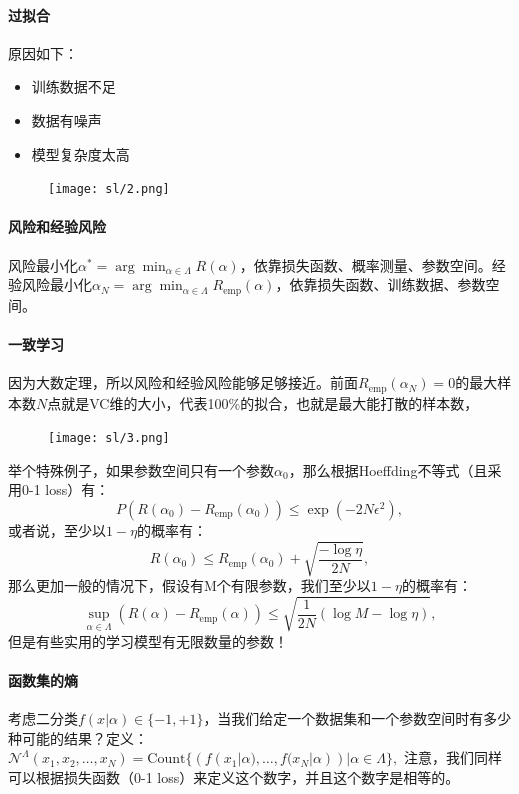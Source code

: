 \paragraph{过拟合} 原因如下：
\begin{itemize}
    \item 训练数据不足
    \item 数据有噪声
    \item 模型复杂度太高
\end{itemize}

\begin{figure}[H]
    \centering
\texttt{[image: sl/2.png]}
\end{figure}

\paragraph{风险和经验风险}
风险最小化$\alpha^*=\arg\min_{\alpha \in \Lambda} R(\alpha)$，依靠损失函数、概率测量、参数空间。经验风险最小化$\alpha_N=\arg\min_{\alpha \in \Lambda} R_\text{emp}(\alpha)$，依靠损失函数、训练数据、参数空间。

\paragraph{一致学习} 因为大数定理，所以风险和经验风险能够足够接近。前面$R_\text{emp}(\alpha_N) = 0$的最大样本数$N$点就是VC维的大小，代表100\%的拟合，也就是最大能打散的样本数，
\begin{figure}[H]
    \centering
\texttt{[image: sl/3.png]}
\end{figure}

举个特殊例子，如果参数空间只有一个参数$\alpha_0$，那么根据Hoeffding不等式（且采用0-1 loss）有：
$$P(R(\alpha_0) - R_\text{emp}(\alpha_0)) \le \exp(-2N\epsilon^2),$$
或者说，至少以$1-\eta$的概率有：
$$R(\alpha_0) \le R_\text{emp}(\alpha_0) + \sqrt{\frac{-\log \eta}{2N}},$$
那么更加一般的情况下，假设有M个有限参数，我们至少以$1-\eta$的概率有：
$$
\sup_{\alpha \in \Lambda}(R(\alpha) - R_\text{emp}(\alpha)) \le \sqrt{\frac{1}{2N}(\log M - \log \eta)},
$$
但是有些实用的学习模型有无限数量的参数！

\paragraph{函数集的熵}
考虑二分类$f(x|\alpha) \in \{-1,+1\}$，当我们给定一个数据集和一个参数空间时有多少种可能的结果？定义：
$\mathcal{N}^{\Lambda}(x_1, x_2, \ldots, x_N) = \mathrm{Count}\{(f(x_1|\alpha), \ldots, f(x_N|\alpha)) | \alpha \in \Lambda\},$
注意，我们同样可以根据损失函数（0-1 loss）来定义这个数字，并且这个数字是相等的。

